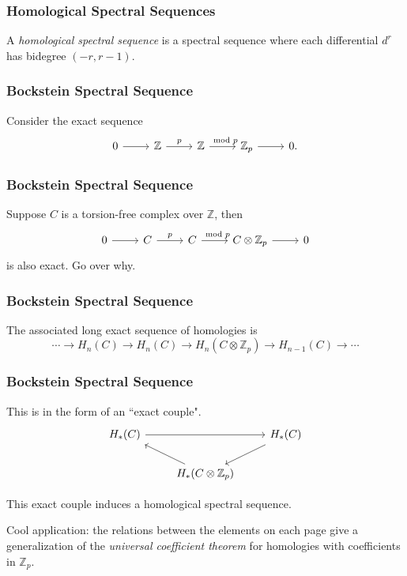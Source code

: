 \documentclass{beamer}
\begin{document}

\begin{frame}
	\frametitle{Homological Spectral Sequences}

	\begin{definition}
		A \textit{homological spectral sequence} is a spectral sequence where each differential $d^{r}$ has bidegree $(-r,r-1)$.
	\end{definition}
\end{frame}

\begin{frame}[fragile]
	\frametitle{Bockstein Spectral Sequence}

	Consider the exact sequence
	\[
		\begin{tikzcd}
			0 \arrow[r] & \mathbb{Z} \arrow[r, "p"] & \mathbb{Z} \arrow[r, "\mod p"] & \mathbb{Z}_p \arrow[r] & 0.
		\end{tikzcd}
	\] 
\end{frame}

\begin{frame}[fragile]
	\frametitle{Bockstein Spectral Sequence}

	Suppose $C$ is a torsion-free complex over $\mathbb{Z}$, then
	\[
		\begin{tikzcd}
                        0 \arrow[r] & C \arrow[r, "p"] & C \arrow[r, "\mod p"] & C \otimes \mathbb{Z}_p \arrow[r] & 0
                \end{tikzcd}
	\] 
	is also exact.
	{\color{red}Go over why.}
\end{frame}

\begin{frame}
	\frametitle{Bockstein Spectral Sequence}

	The associated long exact sequence of homologies is
	\[
	\cdots \to H_{n}(C)\to H_{n}(C) \to H_{n}(C \otimes \mathbb{Z}_{p}) \to H_{n-1}(C) \to \cdots
	\] 
\end{frame}

\begin{frame}[fragile]
	\frametitle{Bockstein Spectral Sequence}

	This is in the form of an ``exact couple".
	\[
		\begin{tikzcd}
			H_{*}(C) \arrow[rr] &&H_{*}(C) \arrow[dl] \\
					    &H_{*}(C \otimes \mathbb{Z}_{p})\arrow[lu]
		\end{tikzcd}
	\] 

	\begin{theorem}
		This exact couple induces a homological spectral sequence.
	\end{theorem}
	\vspace{5mm}
	
	 Cool application: the relations between the elements on each page give a generalization of the \textit{universal coefficient theorem} for homologies with coefficients in $\mathbb{Z}_{p}$.
\end{frame}
\end{document}
